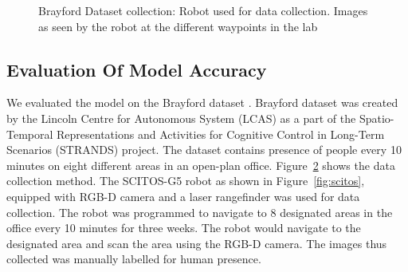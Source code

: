 \begin{figure}
\begin{subfigure}[b]{0.6\textwidth}
        \caption{}
        \label{fig:robot-view}
    \end{subfigure}
    \caption[Brayford dataset collection]{Brayford Dataset collection: \cite{SCITOS_G5} Robot used for data collection. Images  as seen by the robot at the different waypoints in the lab \cite{krajnik_wheres_2015} }\label{fig:brayford-dataset}
\end{figure}

\FloatBarrier
\subsection{Evaluation Of Model Accuracy}

We evaluated the model on the Brayford dataset \cite{krajnik2014long}. Brayford dataset was created by the Lincoln Centre for Autonomous System (LCAS) as a part of the Spatio-Temporal Representations and Activities for Cognitive Control in Long-Term Scenarios (STRANDS) project. The dataset contains presence of people every 10 minutes on eight different areas in an open-plan office.
 Figure~\ref{fig:brayford-dataset} shows the data collection method. The SCITOS-G5 robot as shown in Figure~\ref{fig:scitos}, equipped with RGB-D camera and a laser rangefinder was used for data collection. The robot was programmed to navigate to 8 designated areas in the office every 10 minutes for three weeks. The robot would navigate to the designated area and scan the area using the RGB-D camera. The images thus collected was manually labelled for human presence.  

